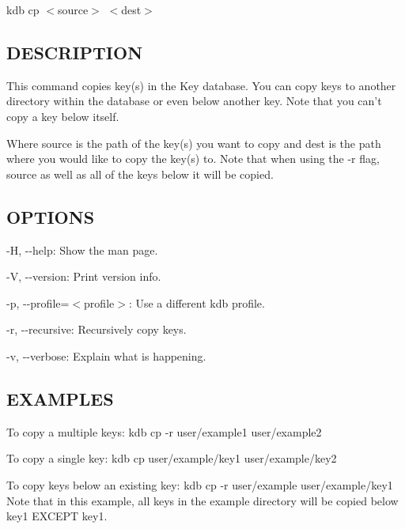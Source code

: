 {\ttfamily kdb cp $<$source$>$ $<$dest$>$}

\subsection*{D\+E\+S\+C\+R\+I\+P\+T\+I\+O\+N}

This command copies key(s) in the Key database. You can copy keys to another directory within the database or even below another key. Note that you can't copy a key below itself.

Where {\ttfamily source} is the path of the key(s) you want to copy and {\ttfamily dest} is the path where you would like to copy the key(s) to. Note that when using the {\ttfamily -\/r} flag, {\ttfamily source} as well as all of the keys below it will be copied.

\subsection*{O\+P\+T\+I\+O\+N\+S}


\begin{DoxyItemize}
\item {\ttfamily -\/\+H}, {\ttfamily -\/-\/help}\+: Show the man page.
\item {\ttfamily -\/\+V}, {\ttfamily -\/-\/version}\+: Print version info.
\item {\ttfamily -\/p}, {\ttfamily -\/-\/profile}=$<$profile$>$\+: Use a different kdb profile.
\item {\ttfamily -\/r}, {\ttfamily -\/-\/recursive}\+: Recursively copy keys.
\item {\ttfamily -\/v}, {\ttfamily -\/-\/verbose}\+: Explain what is happening.
\end{DoxyItemize}

\subsection*{E\+X\+A\+M\+P\+L\+E\+S}

To copy a multiple keys\+: {\ttfamily kdb cp -\/r user/example1 user/example2}

To copy a single key\+: {\ttfamily kdb cp user/example/key1 user/example/key2}

To copy keys below an existing key\+: {\ttfamily kdb cp -\/r user/example user/example/key1} Note that in this example, all keys in the example directory will be copied below {\ttfamily key1} E\+X\+C\+E\+P\+T {\ttfamily key1}. 